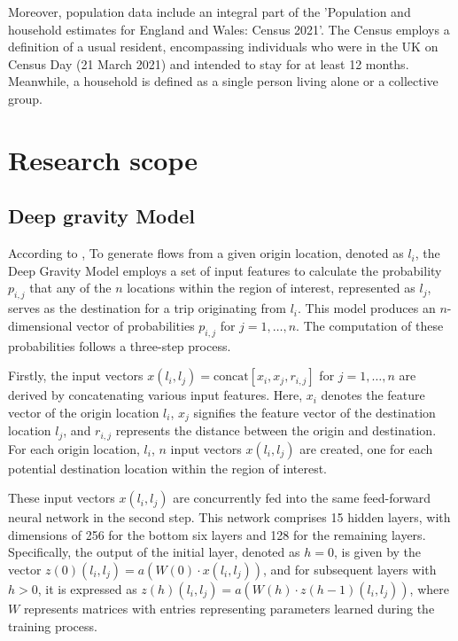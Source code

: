     Moreover, population data include an integral part of the 'Population and household estimates for England and Wales: Census 2021'. The Census employs a definition of a usual resident, encompassing individuals who were in the UK on Census Day (21 March 2021) and intended to stay for at least 12 months. Meanwhile, a household is defined as a single person living alone or a collective group.

    \section{Research scope}

        \subsection{Deep gravity Model}

According to \cite{siminiDeepGravityModel2021}, To generate flows from a given origin location, denoted as \(l_i\), the Deep Gravity Model employs a set of input features to calculate the probability \(p_{i,j}\) that any of the \(n\) locations within the region of interest, represented as \(l_j\), serves as the destination for a trip originating from \(l_i\). This model produces an \(n\)-dimensional vector of probabilities \(p_{i,j}\) for \(j = 1, \ldots, n\). The computation of these probabilities follows a three-step process.

Firstly, the input vectors \(x(l_i, l_j) = \text{concat}[x_i, x_j, r_{i,j}]\) for \(j = 1, \ldots, n\) are derived by concatenating various input features. Here, \(x_i\) denotes the feature vector of the origin location \(l_i\), \(x_j\) signifies the feature vector of the destination location \(l_j\), and \(r_{i,j}\) represents the distance between the origin and destination. For each origin location, \(l_i\), \(n\) input vectors \(x(l_i, l_j)\) are created, one for each potential destination location within the region of interest.

These input vectors \(x(l_i, l_j)\) are concurrently fed into the same feed-forward neural network in the second step. This network comprises 15 hidden layers, with dimensions of 256 for the bottom six layers and 128 for the remaining layers. Specifically, the output of the initial layer, denoted as \(h = 0\), is given by the vector \(z(0)(l_i, l_j) = a(W(0) \cdot x(l_i, l_j))\), and for subsequent layers with \(h > 0\), it is expressed as \(z(h)(l_i, l_j) = a(W(h) \cdot z(h-1)(l_i, l_j))\), where \(W\) represents matrices with entries representing parameters learned during the training process.

